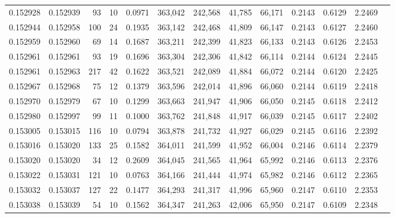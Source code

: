 \begin{tabular}{rrrrrrrrrrrrr}
0.152928 & 0.152939 &    93 &  10 &                                     0.0971 & 363,042 & 242,568 &  41,785 &  66,171 & 0.2143 & 0.6129 & 2.2469 \\
0.152944 & 0.152958 &   100 &  24 &                                     0.1935 & 363,142 & 242,468 &  41,809 &  66,147 & 0.2143 & 0.6127 & 2.2460 \\
0.152959 & 0.152960 &    69 &  14 &                                     0.1687 & 363,211 & 242,399 &  41,823 &  66,133 & 0.2143 & 0.6126 & 2.2453 \\
0.152961 & 0.152961 &    93 &  19 &                                     0.1696 & 363,304 & 242,306 &  41,842 &  66,114 & 0.2144 & 0.6124 & 2.2445 \\
0.152961 & 0.152963 &   217 &  42 &                                     0.1622 & 363,521 & 242,089 &  41,884 &  66,072 & 0.2144 & 0.6120 & 2.2425 \\
0.152967 & 0.152968 &    75 &  12 &                                     0.1379 & 363,596 & 242,014 &  41,896 &  66,060 & 0.2144 & 0.6119 & 2.2418 \\
0.152970 & 0.152979 &    67 &  10 &                                     0.1299 & 363,663 & 241,947 &  41,906 &  66,050 & 0.2145 & 0.6118 & 2.2412 \\
0.152980 & 0.152997 &    99 &  11 &                                     0.1000 & 363,762 & 241,848 &  41,917 &  66,039 & 0.2145 & 0.6117 & 2.2402 \\
0.153005 & 0.153015 &   116 &  10 &                                     0.0794 & 363,878 & 241,732 &  41,927 &  66,029 & 0.2145 & 0.6116 & 2.2392 \\
0.153016 & 0.153020 &   133 &  25 &                                     0.1582 & 364,011 & 241,599 &  41,952 &  66,004 & 0.2146 & 0.6114 & 2.2379 \\
0.153020 & 0.153020 &    34 &  12 &                                     0.2609 & 364,045 & 241,565 &  41,964 &  65,992 & 0.2146 & 0.6113 & 2.2376 \\
0.153022 & 0.153031 &   121 &  10 &                                     0.0763 & 364,166 & 241,444 &  41,974 &  65,982 & 0.2146 & 0.6112 & 2.2365 \\
0.153032 & 0.153037 &   127 &  22 &                                     0.1477 & 364,293 & 241,317 &  41,996 &  65,960 & 0.2147 & 0.6110 & 2.2353 \\
0.153038 & 0.153039 &    54 &  10 &                                     0.1562 & 364,347 & 241,263 &  42,006 &  65,950 & 0.2147 & 0.6109 & 2.2348 \\

\end{tabular}

